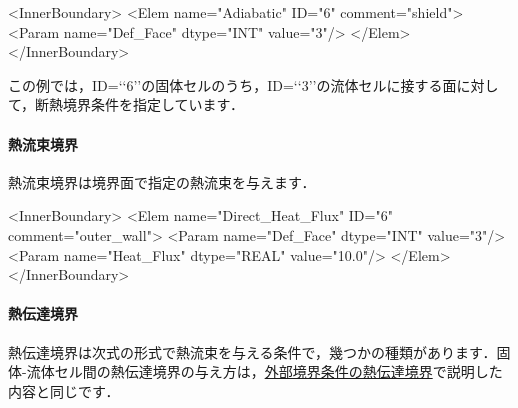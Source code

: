 {\small
\begin{program}
<InnerBoundary>
  <Elem name="Adiabatic" ID="6" comment="shield">
    <Param name="Def_Face" dtype="INT" value="3"/>
  </Elem>
</InnerBoundary>
\end{program}
}
この例では，ID=\lq\lq 6\rq\rq の固体セルのうち，ID=\lq\lq 3\rq\rq の流体セルに接する面に対して，断熱境界条件を指定しています．

%
\paragraph{熱流束境界}
熱流束境界は境界面で指定の熱流束を与えます．

{\small
\begin{program}
<InnerBoundary>
  <Elem name="Direct_Heat_Flux" ID="6" comment="outer_wall">
    <Param name="Def_Face"    dtype="INT"    value="3"/>
    <Param name="Heat_Flux"   dtype="REAL"   value="10.0"/>
  </Elem>
</InnerBoundary>
\end{program}
}

%
\paragraph{熱伝達境界}
熱伝達境界は次式の形式で熱流束を与える条件で，幾つかの種類があります．固体-流体セル間の熱伝達境界の与え方は，\hyperlink{tgt:heat-transfer}{外部境界条件の熱伝達境界}で説明した内容と同じです．

